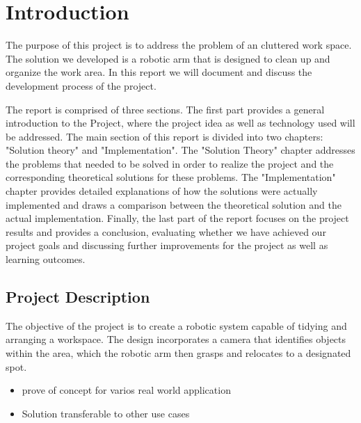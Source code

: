 \chapter{Introduction} %
\label{CH1} %
The purpose of this project is to address the problem of an cluttered work space.
The solution we developed is a robotic arm that is designed to clean up and organize the work area. 
In this report we will document and discuss the development process of the project. 

The report is comprised of three sections. The first part provides a general introduction to the Project, where the project idea as well as technology used will be addressed. The main section of this report is divided into two chapters: "Solution theory" and "Implementation".
The "Solution Theory" chapter addresses the problems that needed to be solved in order to realize the project and the corresponding theoretical solutions for these problems. 
The "Implementation" chapter provides detailed explanations of how the solutions were actually implemented and draws a comparison between the theoretical solution and the actual implementation. Finally, the last part of the report focuses on the project results and provides a conclusion, evaluating whether we have achieved our project goals and discussing further improvements for the project as well as learning outcomes. 

\section{Project Description}

The objective of the project is to create a robotic system capable of tidying and arranging a workspace. The design incorporates a camera that identifies objects within the area, which the robotic arm then grasps and relocates to a designated spot.

\begin{itemize}
    \item prove of concept for varios real world application
    \item Solution transferable to other use cases
\end{itemize}


